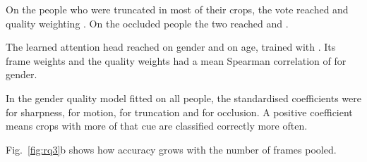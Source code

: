 On the  people who were truncated in most of their
crops, the vote reached  and quality
weighting . On the 
occluded people the two reached  and
.

The learned attention head reached  on gender
and  on age, trained with
. Its frame weights and the quality weights had a mean
Spearman correlation of  for gender.

In the gender quality model fitted on all people, the standardised coefficients
were  for sharpness,
 for motion, 
for truncation and  for occlusion. A positive
coefficient means crops with more of that cue are classified correctly more
often.

Fig.~\ref{fig:rq3}b shows how accuracy grows with the number of frames pooled.
